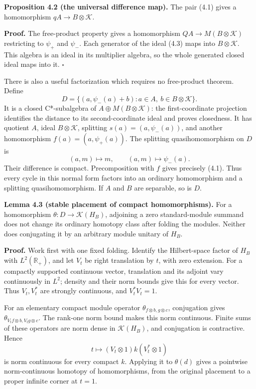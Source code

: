 \documentclass[
  11pt,
]{article}
\begin{document}
\textbf{Proposition 4.2 (the universal difference map).} The pair (4.1)
gives a homomorphism \(qA\to B\otimes\mathcal K\).

\textbf{Proof.} The free-product property gives a homomorphism
\(QA\to M(B\otimes\mathcal K)\) restricting to \(\psi_+\) and
\(\psi_-\). Each generator of the ideal (4.3) maps into
\(B\otimes\mathcal K\). This algebra is an ideal in its multiplier
algebra, so the whole generated closed ideal maps into it. \(\square\)

There is also a useful factorization which requires no free-product
theorem. Define \[
D=\{(a,\psi_-(a)+b):a\in A,\ b\in B\otimes\mathcal K\}.
\tag{4.4}
\] It is a closed C*-subalgebra of \(A\oplus M(B\otimes\mathcal K)\):
the first-coordinate projection identifies the distance to its
second-coordinate ideal and proves closedness. It has quotient \(A\),
ideal \(B\otimes\mathcal K\), splitting \(s(a)=(a,\psi_-(a))\), and
another homomorphism \(f(a)=(a,\psi_+(a))\). The splitting
quasihomomorphism on \(D\) is \[
(a,m)\longmapsto m,\qquad
(a,m)\longmapsto\psi_-(a).
\tag{4.5}
\] Their difference is compact. Precomposition with \(f\) gives
precisely (4.1). Thus every cycle in this normal form factors into an
ordinary homomorphism and a splitting quasihomomorphism. If \(A\) and
\(B\) are separable, so is \(D\).

\textbf{Lemma 4.3 (stable placement of compact homomorphisms).} For a
homomorphism \(\theta:D\to\mathcal K(H_B)\), adjoining a zero
standard-module summand does not change its ordinary homotopy class
after folding the modules. Neither does conjugating it by an arbitrary
module unitary of \(H_B\).

\textbf{Proof.} Work first with one fixed folding. Identify the
Hilbert-space factor of \(H_B\) with \(L^2(\mathbb R_+)\), and let
\(V_t\) be right translation by \(t\), with zero extension. For a
compactly supported continuous vector, translation and its adjoint vary
continuously in \(L^2\); density and their norm bounds give this for
every vector. Thus \(V_t,V_t^*\) are strongly continuous, and
\(V_t^*V_t=1\).

For an elementary compact module operator
\(\theta_{f\otimes b,g\otimes c}\), conjugation gives
\(\theta_{V_tf\otimes b,V_tg\otimes c}\). The rank-one norm bound makes
this norm continuous. Finite sums of these operators are norm dense in
\(\mathcal K(H_B)\), and conjugation is contractive. Hence \[
t\longmapsto (V_t\otimes1)k(V_t^*\otimes1)
\tag{4.6}
\] is norm continuous for every compact \(k\). Applying it to
\(\theta(d)\) gives a pointwise norm-continuous homotopy of
homomorphisms, from the original placement to a proper infinite corner
at \(t=1\).
\end{document}
